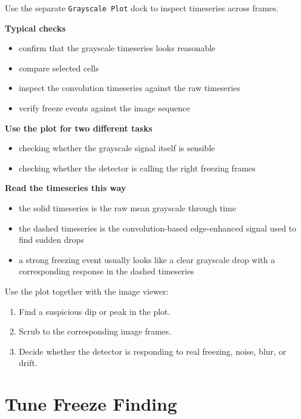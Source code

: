 \documentclass[
  9pt,
  letterpaper,
  oneside,
  open=any,
  DIV=15,
  parskip=half-,
  headings=big,
  numbers=noenddot
]{scrbook}
\newcommand{\manuallead}[1]{%
  \vspace{0.15em}%
  {\sffamily\bfseries\color{ManualBlue}#1}\par\nobreak\vspace{0.05em}%
}
\begin{document}
Use the separate \texttt{Grayscale Plot} dock to inspect timeseries across frames.


\manuallead{Typical checks}

\begin{itemize}[leftmargin=*,itemsep=0.35em,topsep=0.4em]
\item confirm that the grayscale timeseries looks reasonable
\item compare selected cells
\item inspect the convolution timeseries against the raw timeseries
\item verify freeze events against the image sequence
\end{itemize}

\manuallead{Use the plot for two different tasks}

\begin{itemize}[leftmargin=*,itemsep=0.35em,topsep=0.4em]
\item checking whether the grayscale signal itself is sensible
\item checking whether the detector is calling the right freezing frames
\end{itemize}

\manuallead{Read the timeseries this way}

\begin{itemize}[leftmargin=*,itemsep=0.35em,topsep=0.4em]
\item the solid timeseries is the raw mean grayscale through time
\item the dashed timeseries is the convolution-based edge-enhanced signal used to find sudden drops
\item a strong freezing event usually looks like a clear grayscale drop with a corresponding response in the dashed timeseries
\end{itemize}

Use the plot together with the image viewer:


\begin{enumerate}[leftmargin=*,itemsep=0.35em,topsep=0.4em]
\item Find a suspicious dip or peak in the plot.
\item Scrub to the corresponding image frames.
\item Decide whether the detector is responding to real freezing, noise, blur, or drift.
\end{enumerate}

\section{Tune Freeze Finding}
\end{document}
